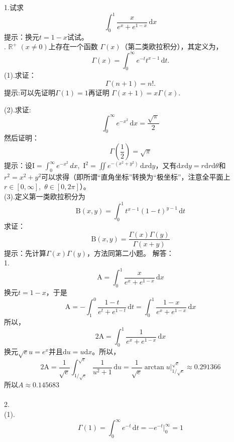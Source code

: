 \documentclass[11pt,a4paper,openany]{article}
\begin{document}
\noindent 
1.试求
$$\int_0^1 \frac{x}{e^x+e^{1-x}}\, \mathrm{d}x$$
\indent 提示：换元$t=1-x$试试。
\\

.
$\mathbb{R}^{+}$ $\left(x\neq 0\right)$上存在一个函数
$\Gamma\left(x\right)$（第二类欧拉积分），其定义为，
\[
\Gamma\left(x\right)=
\int^{\infty}_{0}e^{-t}t^{x-1}\,\mathrm{d}t.
\]
\indent (1).求证：
$$\Gamma\left(n+1\right)=n!.$$
\indent 提示:可以先证明$\Gamma\left(1\right)=1$再证明
$\Gamma\left(x+1\right)=x\Gamma\left(x\right)$.

(2).求证:
\[
\int_0^{\infty } e^{-x^2} \,\mathrm{d}x=\frac{\sqrt{\pi }}{2}
\]
\indent 然后证明：
\[
\Gamma\left(\frac{1}{2}\right)=
\sqrt{\pi }
\]
\indent 提示：设$\text{I}=\int_0^{\infty } e^{-x^2} \, dx$,\ $\text{I}^2=\iint e^{-(x^2+y^2)} \,\mathrm{d}x\mathrm{d}y$，又有$\mathrm{d}x\mathrm{d}y=r\mathrm{d}r\mathrm{d}\theta$和$r^2=x^2+y^2$可以求得（即所谓“直角坐标”转换为“极坐标”，注意全平面上$r\in[0,\infty]$,\ $\theta\in[0,2\pi]$）。\\
\indent (3).定义第一类欧拉积分为\[
\mathrm{B}(x,y)= \int_0^1t^{x-1}(1-t)^{y-1}\,\mathrm{d}t
\]
\indent 求证：
\[
\mathrm{B}(x,y)=\frac{\Gamma(x)\Gamma(y)}{\Gamma(x+y)}
\]
\indent 提示：先计算$\Gamma(x)\Gamma(y)$，方法同第二小题。
\newpage
解答：\\
1.$$\text{A}=\int_0^1 \frac{x}{e^x+e^{1-x}}\, \mathrm{d}x
$$
换元$t=1-x$，于是
$$\text{A}=-\int_1^0 \frac{1-t}{e^t+e^{1-t}}\, \mathrm{d}t
=\int_0^1 \frac{1-x}{e^x+e^{1-x}}\, \mathrm{d}x
$$
所以，
$$2\text{A}=
\int_0^1 \frac{1}{e^x+e^{1-x}}\, \mathrm{d}x
$$
换元$\sqrt{e}u=e^x$并且$\mathrm{d}u=u\mathrm{d}x$。所以，
$$2\text{A}=
\frac{1}{\sqrt{e}}\int_{1/\sqrt{e}}^{\sqrt{e}} \frac{1}{u^2+1}\, \mathrm{d}u
=\frac{1}{\sqrt{e}}\arctan{u}\bigg|_{1/\sqrt{e}}^{\sqrt{e}}
\approx 0.291366
$$
所以$A\approx 0.145683$
\\
\\
2.\\
(1).\[
\Gamma\left(1\right)=
\int^{\infty}_{0}e^{-t}\,\mathrm{d}t=-e^{-t}\bigg|^{\infty}_{0}=1
\]
\end{document}
